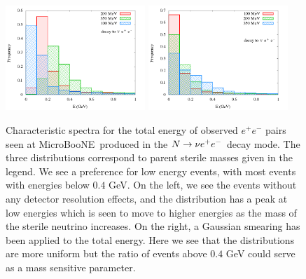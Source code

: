 \documentclass[11pt, a4paper]{article}
\def\muboone{MicroBooNE}
\def\ster{\ensuremath N}
\begin{document}
\begin{figure}[t]
%
\center
%
\includegraphics[width=0.47\textwidth]{figures/spectrum_ee.png} \includegraphics[width=0.47\textwidth]{figures/spectrum_ee_smeared.png}
%
\caption{\label{fig:spectrum_ee} Characteristic spectra for the total energy of observed  $e^+e^-$ pairs seen at \muboone\ produced in the $\ster \to \nu e^+e^-$ decay mode. The three distributions correspond to parent sterile masses given in the legend. We see a preference for low energy events, with most events with energies below $0.4$ GeV. On the left, we see the events without any detector resolution effects, and the distribution has a peak at low energies which is seen to move to higher energies as the mass of the sterile neutrino increases. On the right, a Gaussian smearing has been applied to the total energy. Here we see that the distributions are more uniform but the ratio of events above $0.4$ GeV could serve as a mass sensitive parameter.}
%
\end{figure}
 
\end{document}
